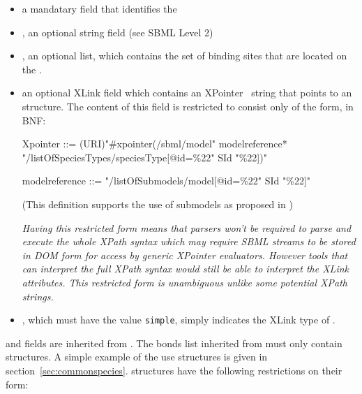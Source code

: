 \documentclass{cekarticle}
\begin{document}
\begin{itemize}

\item {} a mandatary  field that identifies the 

\item {}, an optional string field (see SBML Level 2)

\item {}, an optional  list, which contains the set of binding
sites that are located on the .

\item {} an optional XLink field which contains an
XPointer~\citep{derose:2002} string that points to an
 structure.  The content of this field is
restricted to consist only of the form, in BNF:

\begin{example}
   Xpointer ::=
     (URI)"#xpointer(/sbml/model"
     modelreference*
     "/listOfSpeciesTypes/speciesType[@id=\%22" SId "\%22])"

   modelreference ::= "/listOfSubmodels/model[@id=\%22" SId "\%22]"
\end{example}

(This definition supports the use of submodels as proposed in
\cite{finney:2003b})

\emph{Having this restricted form means that parsers won't be
required to parse and execute the whole XPath syntax which may
require SBML streams to be stored in DOM form for access by
generic XPointer evaluators. However tools that can interpret the
full XPath syntax would still be able to interpret the XLink
attributes. This restricted form is unambiguous unlike some
potential XPath strings.}

\item {}, which must have the value \texttt{simple},
simply indicates the XLink type of .

\end{itemize}

 and  fields are
inherited from . The bonds list inherited from
 must only contain 
structures. A simple example of the use 
structures is given in section~\ref{sec:commonspecies}.
 structures have the following restrictions on
their form:
\end{document}
